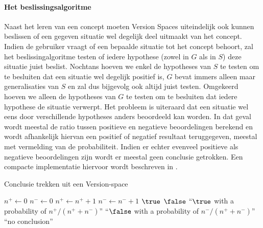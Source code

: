 \paragraph{Het beslissingsalgoritme}
Naast het leren van een concept moeten Version Spaces uiteindelijk ook kunnen beslissen of een gegeven situatie wel degelijk deel uitmaakt van het concept. Indien de gebruiker vraagt of een bepaalde situatie tot het concept behoort, zal het beslissingalgoritme testen of iedere hypothese (zowel in $G$ als in $S$) deze situatie juist beslist. Nochtans hoeven we enkel de hypotheses van $S$ te testen om te besluiten dat een situatie wel degelijk positief is, $G$ bevat immers alleen maar generalisaties van $S$ en zal dus bijgevolg ook altijd juist testen. Omgekeerd hoeven we alleen de hypotheses van $G$ te testen om te besluiten dat iedere hypothese de situatie verwerpt. Het probleem is uiteraard dat een situatie wel eens door verschillende hypotheses anders beoordeeld kan worden. In dat geval wordt meestal de ratio tussen positieve en negatieve beoordelingen berekend en wordt afhankelijk hiervan een positief of negatief resultaat teruggegeven, meestal met vermelding van de probabiliteit. Indien er echter evenveel positieve als negatieve beoordelingen zijn wordt er meestal geen conclusie getrokken. Een compacte implementatie hiervoor wordt beschreven in .
\begin{algorithm}[htb]                      %
\caption{Conclusie trekken uit een Version-space}          %
\label{alg:versionSpacesConclusion}                           %
\begin{algorithmic}[1]                    %
\STATE$n^+\leftarrow0$
\STATE$n^-\leftarrow0$
\STATE$n^+\leftarrow n^++1$
\ELSE
\STATE$n^-\leftarrow n^-+1$
\ENDIF
\ENDFOR
{}
\RETURN $\true$
\RETURN $\false$
\RETURN ``$\true$ with a probability of $n^+/(n^++n^-)$''
\RETURN ``$\false$ with a probability of $n^-/(n^++n^-)$''
\ELSE[$n^+=n^-$]
\RETURN ``no conclusion''
\ENDIF
\end{algorithmic}
\end{algorithm}
